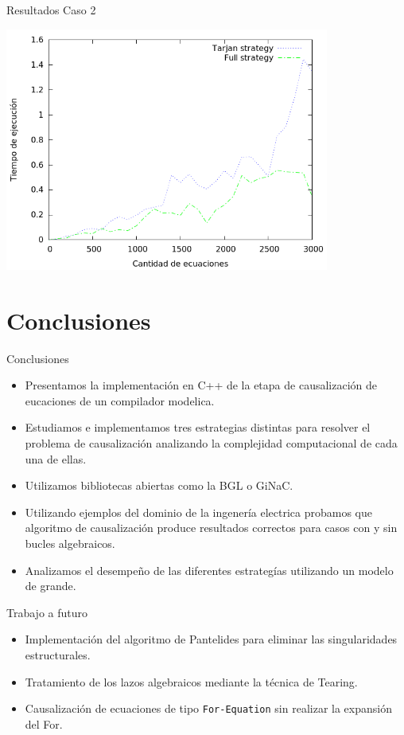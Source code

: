 \begin{frame}{Resultados Caso 2}
\begin{center}
\includegraphics[width=0.8\textwidth]{graphics/OneDHeatTransfer_loop.png}
\end{center}
\end{frame}

\section{Conclusiones}

\begin{frame}{Conclusiones}
    \begin{itemize}
        \item<1-> Presentamos la implementación en C++ de la etapa de causalización de eucaciones de un compilador modelica.
        \item<2-> Estudiamos e implementamos tres estrategias distintas para resolver el problema de causalización analizando la complejidad computacional de cada una de ellas.
        \item<3-> Utilizamos bibliotecas abiertas como la BGL o GiNaC.
        \item<4-> Utilizando ejemplos del dominio de la ingenería electrica probamos que algoritmo de causalización produce resultados correctos para casos con y sin bucles algebraicos.
        \item<5-> Analizamos el desempeño de las diferentes estrategías utilizando un modelo de grande.
    \end{itemize}
\end{frame}

\begin{frame}[fragile]{Trabajo a futuro}
    \begin{itemize}
        \item Implementación del algoritmo de Pantelides para eliminar las singularidades estructurales.
        \item Tratamiento de los lazos algebraicos mediante la técnica de Tearing.
        \item Causalización de ecuaciones de tipo \verb+For-Equation+ sin realizar la expansión del For.
    \end{itemize}
\end{frame}

